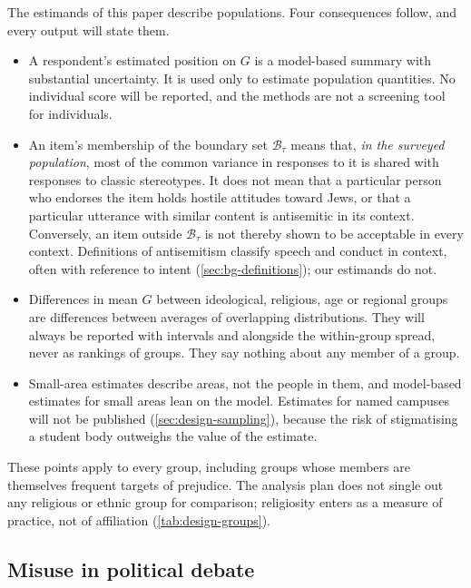 The estimands of this paper describe populations. Four consequences follow, and every output will state them.
\begin{itemize}
  \item A respondent's estimated position on $G$ is a model-based summary with substantial uncertainty. It is used only to estimate population quantities. No individual score will be reported, and the methods are not a screening tool for individuals.
  \item An item's membership of the boundary set $\mathcal{B}_\tau$ means that, \emph{in the surveyed population}, most of the common variance in responses to it is shared with responses to classic stereotypes. It does not mean that a particular person who endorses the item holds hostile attitudes toward Jews, or that a particular utterance with similar content is antisemitic in its context. Conversely, an item outside $\mathcal{B}_\tau$ is not thereby shown to be acceptable in every context. Definitions of antisemitism classify speech and conduct in context, often with reference to intent (\cref{sec:bg-definitions}); our estimands do not.
  \item Differences in mean $G$ between ideological, religious, age or regional groups are differences between averages of overlapping distributions. They will always be reported with intervals and alongside the within-group spread, never as rankings of groups. They say nothing about any member of a group.
  \item Small-area estimates describe areas, not the people in them, and model-based estimates for small areas lean on the model. Estimates for named campuses will not be published (\cref{sec:design-sampling}), because the risk of stigmatising a student body outweighs the value of the estimate.
\end{itemize}
These points apply to every group, including groups whose members are themselves frequent targets of prejudice. The analysis plan does not single out any religious or ethnic group for comparison; religiosity enters as a measure of practice, not of affiliation (\cref{tab:design-groups}).

\subsection{Misuse in political debate}\label{sec:ethics-misuse}

